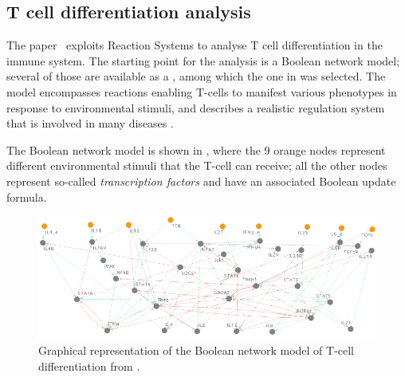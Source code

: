 

\subsection{T cell differentiation analysis}\label{sec:datamod2023}

The paper~\cite{datamod2023} exploits Reaction Systems to analyse T cell differentiation in the immune system. The starting point for the analysis is a Boolean network model; several of those are available as a \cite{saez2007logical,thakar2010boolean,puniya2018mechanistic}, among which the one in \cite{puniya2018mechanistic} was selected. The model encompasses reactions enabling T-cells to manifest various phenotypes in response to environmental stimuli, and describes a realistic regulation system that is involved in many diseases \cite{lafaille1998role,hirahara2016cd4+,meng2016regulatory}.

The Boolean network model is shown in , where the 9 orange nodes represent different environmental stimuli that the T-cell can receive; all the other nodes represent so-called \emph{transcription factors} and have an associated Boolean update formula.

\begin{figure}[t]
	\begin{center}
		\includegraphics[width=\columnwidth]{figs-datamod2023/Tcell-graph-8set23.png}
	\end{center}
	\caption{Graphical representation of the Boolean network model of T-cell differentiation from \cite{puniya2018mechanistic}.}
	\label{fig:model-graph}
\end{figure}

